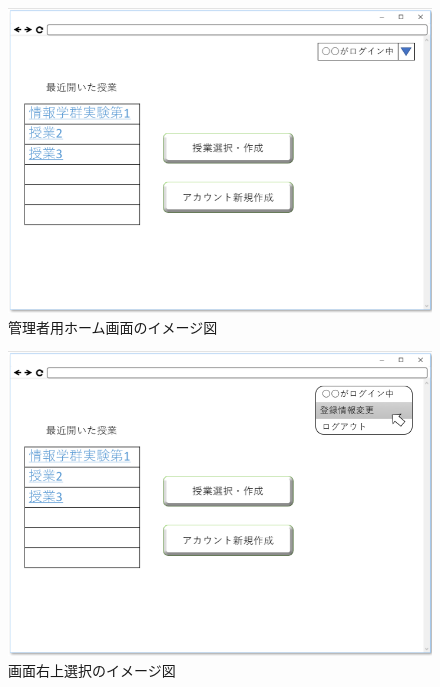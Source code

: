 \begin{figure}[phtbp]
  \begin{center}
    \includegraphics[width=1\linewidth,clip]{./img/04.png}
    \caption{管理者用ホーム画面のイメージ図}\label{fig:04}
  \end{center}
\end{figure}

\begin{figure}[phtbp]
  \begin{center}
    \includegraphics[width=1\linewidth,clip]{./img/05.png}
    \caption{画面右上選択のイメージ図}\label{fig:05}
  \end{center}
\end{figure}

\newpage

